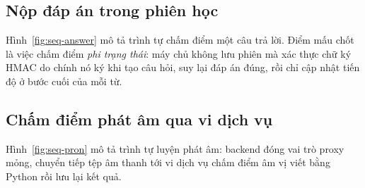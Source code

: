 \subsection{Nộp đáp án trong phiên học}
\label{subsec:seq-answer}

Hình~\ref{fig:seq-answer} mô tả trình tự chấm điểm một câu trả lời. Điểm mấu
chốt là việc chấm điểm \textit{phi trạng thái}: máy chủ không lưu phiên mà
xác thực chữ ký HMAC do chính nó ký khi tạo câu hỏi, suy lại đáp án đúng,
rồi chỉ cập nhật tiến độ ở bước cuối của mỗi từ.


\subsection{Chấm điểm phát âm qua vi dịch vụ}
\label{subsec:seq-pron}

Hình~\ref{fig:seq-pron} mô tả trình tự luyện phát âm: backend đóng vai trò
proxy mỏng, chuyển tiếp tệp âm thanh tới vi dịch vụ chấm điểm âm vị viết
bằng Python rồi lưu lại kết quả.


